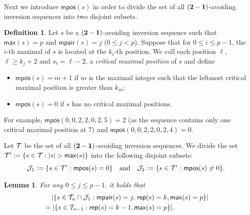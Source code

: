 \documentclass[12pt]{amsart}
\newcounter{mycount}
\theoremstyle{plain}
\newtheorem{lemma}[mycount]{Lemma}
\theoremstyle{definition}
\newtheorem{definition}{Definition}
\theoremstyle{example}
\theoremstyle{remark}
\numberwithin{equation}{section}
\numberwithin{figure}{section}
\def\max{\mathsf{max}}
\def\rep{\mathsf{rep}}
\def\mpair{\mathsf{mpair}}
\def\mpos{\mathsf{mpos}}
\def\T{\CMcal{T}}
\begin{document}
Next we introduce $\mathsf{mpos}(s)$ in order to divide the set of all $({\bf2-1})$-avoiding inversion sequences into two disjoint subsets.

\begin{definition}
Let $s$ be a $({\bf2-1})$-avoiding inversion sequence such that $\mathsf{max}(s)=p$ and $\mathsf{mpair}(s)=j$ ($0\le j<p$).  Suppose that for $0\le i\le p-1$, the $i$-th maximal of $s$ is located at the $k_{i}$-th position.  We call each position $\ell$, $\ell\ge k_j+2$ and $s_{\ell}=\ell-2$, a {\em critical maximal position} of $s$ and define
\begin{itemize}
\item $\mathsf{mpos}(s)=m+1$ if $m$ is the maximal integer such that the leftmost critical maximal position is greater than $k_{m}$;
\item $\mathsf{mpos}(s)=0$ if $s$ has no critical maximal positions.
\end{itemize}
For example, $\mathsf{mpos}(0,0,2,2,0,2,5)=2$ (as the sequence contains only one critical maximal   position at $7$) and $\mathsf{mpos}(0,0,2,2,0,2,4)=0$.
\end{definition}


Let $\T$ be the set of all $({\bf2-1})$-avoiding inversion sequences. We divide the set $\T':=\{s\in\T:|s|>\max(s)\}$ into the following disjoint subsets:
$$
\CMcal{J}_1:=\{s\in\CMcal{T}':  \mpos(s)=0\}\quad\text{and}\quad
\CMcal{J}_2:=\{s\in\CMcal{T}': \mpos(s)\ne0\}.
$$


\begin{lemma}\label{L:d1}
For any $0\le j\le p-1$, it holds that
\begin{align*}
&\,\quad \vert\{s\in \CMcal{T}_n\cap\CMcal{J}_{1}: \mpair(s)=j,\,\rep(s)=k,  \max(s)=p\}\vert\\
&=\vert\{s\in \CMcal{T}_{n-1}: \rep(s)=k-1,\max(s)=p\}\vert.
\end{align*}
\end{lemma}
\end{document}
